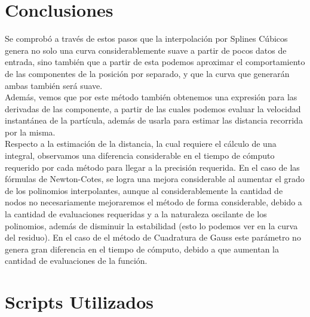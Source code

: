 \documentclass{article}
\begin{document}
    \section{Conclusiones}
    Se comprobó a través de estos pasos que la interpolación por Splines Cúbicos genera no solo una curva considerablemente suave a partir de pocos datos de entrada, sino también que a partir de esta podemos aproximar el comportamiento de las componentes de la posición por separado, y que la curva que generarán ambas también será suave.\\
    \indent Además, vemos que por este método también obtenemos una expresión para las derivadas de las componente, a partir de las cuales podemos evaluar la velocidad instantánea de la partícula, además de usarla para estimar las distancia recorrida por la misma.\\
    \indent Respecto a la estimación de la distancia, la cual requiere el cálculo de una integral, observamos una diferencia considerable en el tiempo de cómputo requerido por cada método para llegar a la precisión requerida. En el caso de las fórmulas de Newton-Cotes, se logra una mejora considerable al aumentar el grado de los polinomios interpolantes, aunque al considerablemente la cantidad de nodos no necesariamente mejoraremos el método de forma considerable, debido a la cantidad de evaluaciones requeridas y a la naturaleza oscilante de los polinomios, además de disminuir la estabilidad (esto lo podemos ver en la curva del residuo). En el caso de el método de Cuadratura de Gauss este parámetro no genera gran diferencia en el tiempo de cómputo, debido a que aumentan la cantidad de evaluaciones de la función.

    \section{Scripts Utilizados}
\end{document}
